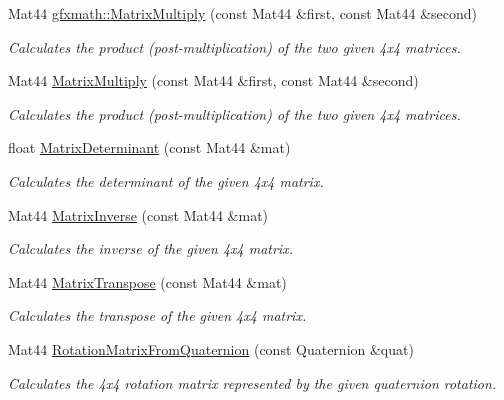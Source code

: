 \begin{DoxyCompactItemize}
\item 
Mat44 \hyperlink{group___s_i_s_d_mat_math_ga4439d3f4590c372ada775196d1576f81}{gfxmath\+::\+Matrix\+Multiply} (const Mat44 \&first, const Mat44 \&second)
\begin{DoxyCompactList}\small\item\em Calculates the product (post-\/multiplication) of the two given 4x4 matrices. \end{DoxyCompactList}\item 
Mat44 \hyperlink{group___s_i_s_d_mat_math_ga4439d3f4590c372ada775196d1576f81}{Matrix\+Multiply} (const Mat44 \&first, const Mat44 \&second)
\begin{DoxyCompactList}\small\item\em Calculates the product (post-\/multiplication) of the two given 4x4 matrices. \end{DoxyCompactList}\item 
float \hyperlink{group___s_i_s_d_mat_math_ga285829d964b38ad14730e85c325e775c}{Matrix\+Determinant} (const Mat44 \&mat)
\begin{DoxyCompactList}\small\item\em Calculates the determinant of the given 4x4 matrix. \end{DoxyCompactList}\item 
Mat44 \hyperlink{group___s_i_s_d_mat_math_ga38c661c8ad19528520d36fabca7d555f}{Matrix\+Inverse} (const Mat44 \&mat)
\begin{DoxyCompactList}\small\item\em Calculates the inverse of the given 4x4 matrix. \end{DoxyCompactList}\item 
Mat44 \hyperlink{group___s_i_s_d_mat_math_ga626e52b58fb763a90ba6e9d46966ee75}{Matrix\+Transpose} (const Mat44 \&mat)
\begin{DoxyCompactList}\small\item\em Calculates the transpose of the given 4x4 matrix. \end{DoxyCompactList}\item 
Mat44 \hyperlink{group___s_i_s_d_mat_math_gad7198c521a4d93e82694f39f0be736c9}{Rotation\+Matrix\+From\+Quaternion} (const Quaternion \&quat)
\begin{DoxyCompactList}\small\item\em Calculates the 4x4 rotation matrix represented by the given quaternion rotation. \end{DoxyCompactList}\item 

\end{DoxyCompactItemize}
